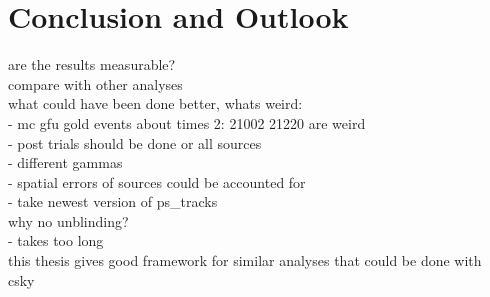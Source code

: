 \chapter{Conclusion and Outlook} \label{sec:outlook}
are the results measurable?\\
compare with other analyses\\

what could have been done better, whats weird:\\
- mc gfu gold events about times 2: 21002 21220 are weird\\
- post trials should be done or all sources\\
- different gammas\\
- spatial errors of sources could be accounted for\\
- take newest version of ps\_tracks\\
why no unblinding?\\
- takes too long\\

this thesis gives good framework for similar analyses that could be done with csky
